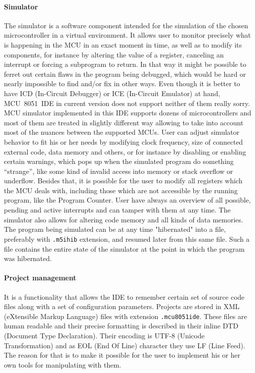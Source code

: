 \documentclass[a4paper,twoside,12pt]{book}
\newcommand{\fileextension}[1]{\texttt{#1}}
\begin{document}
		\paragraph{Simulator} The simulator is a software component intended for the simulation of the chosen microcontroller in a virtual environment. It allows user to monitor precisely what is happening in the MCU in an exact moment in time, as well as to modify its components, for instance by altering the value of a register, canceling an interrupt or forcing a subprogram to return. In that way it might be possible to ferret out certain flaws in the  program being debugged, which would be hard or nearly impossible to find and/or fix in other ways. Even though it is better to have ICD (In-Circuit Debugger) or ICE (In-Circuit Emulator) at hand, MCU~8051~IDE in current version does not support neither of them %
really sorry.
		MCU simulator implemented in this IDE supports dozens of microcontrollers and most of them are treated in slightly different way allowing to take into account most of the nuances between the supported MCUs. User can adjust simulator behavior to fit his or her needs by modifying clock frequency, size of connected external code, data memory and others, or for instance by disabling or enabling certain warnings, which pops up when the simulated program do something ``strange'', like some kind of invalid access into memory or stack overflow or underflow. Besides that, it is possible for the user to modify all registers which the MCU deals with, including those which are not accessible by the running program, like the Program Counter. User have always an overview of all possible, pending and active interrupts and can tamper with them at any time. The simulator also allows for altering code memory and all kinds of data memories. The program being simulated can be at any time "hibernated" into a file, preferably
with \fileextension{.m5ihib} extension, and resumed later from this same file. Such a file contains the entire state of the simulator at the point in which the program was hibernated.

		\paragraph{Project management} It is a functionality that allows the IDE to remember certain set of source code files along with a set of configuration parameters. Projects are stored in XML (eXtensible Markup Language) files with extension \fileextension{.mcu8051ide}. These files are human readable and their precise formatting is described in their inline DTD (Document Type Declaration). Their encoding is UTF-8 (Unicode Transformation) and as EOL (End Of Line) character they use LF (Line Feed). The reason for that is to make it possible for the user to implement his or her own tools for manipulating with them.
\end{document}
